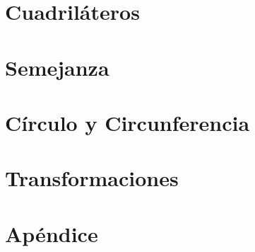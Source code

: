 \documentclass[12pt,titlepage]{article}
\theoremstyle{plain}
\theoremstyle{definition}
\theoremstyle{remark}
\begin{document}
\clearpage

\section{Cuadriláteros}


\clearpage

\section{Semejanza}


\clearpage

\section{Círculo y Circunferencia}


\section{Transformaciones}
 

\clearpage
\appendix

\section{Apéndice}



%

% 
\end{document}

